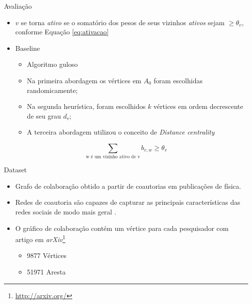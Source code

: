\documentclass[t,14pt,mathserif,xcolor=table]{beamer}
\begin{document}
\begin{frame}{Avaliação}

	\begin{itemize}
		
		\item $v$ se torna \textit{ativo} se o somatório dos pesos de seus vizinhos \textit{ativos} sejam $\geq \theta_v$, conforme Equação \ref{eq:ativacao}{}
		
		\item Baseline  \cite{kempe2003maximizing} 
		
	\begin{itemize}
		\item Algoritmo guloso
		\item Na primeira abordagem os vértices em $A_{0}$ foram escolhidas randomicamente;
		\item Na segunda heurística, foram escolhidos $k$ vértices em ordem decrescente de seu grau $d_{v}$;
		\item A terceira abordagem utilizou o conceito de \textit{Distance centrality} \cite{scott2012social}
	\end{itemize}
		
		
	\end{itemize}
	
\begin{equation} \label{eq:ativacao}
\sum\limits_{\textrm{w é um vizinho ativo de v}}{b_{v,w} \geq \theta_v}
\end{equation}

\end{frame}

\begin{frame}{Dataset}

	\begin{itemize}
		
		\item Grafo de colaboração obtido a partir de coautorias em publicações de física\cite{snapnets}.
		\item Redes de coautoria são capazes de capturar as principais características das redes sociais de modo mais geral \cite{newman2001structure}.
	\item O gráfico de colaboração contém um vértice para cada pesquisador com artigo em \textit{arXiv}\footnote{\url{http://arxiv.org/}}
	\begin{itemize}	
		\item 9877 Vértices
		\item 51971 Aresta	
	\end{itemize}
	
	\end{itemize}
\end{frame}
\end{document}
